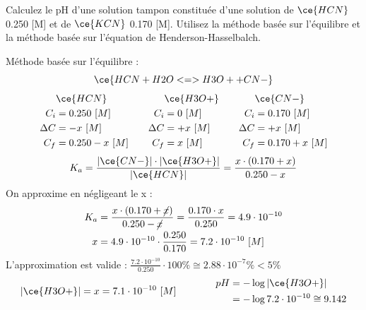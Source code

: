 \documentclass[
  11pt,
  french,
  a4paper,
  openany]{book}
\begin{document}
\begin{Exercise}
Calculez le pH d'une solution tampon constituée d'une solution de \(\ce{HCN}\) 0.250 {[}M{]} et de \(\ce{KCN}\) 0.170 {[}M{]}. Utilisez la méthode basée sur l'équilibre et la méthode basée sur l'équation de Henderson-Hasselbalch.

\end{Exercise}

\begin{Answer}
Méthode basée sur l'équilibre :
\[
\ce{HCN + H2O <=> H3O+ + CN-}
\]
\[
\begin{split}
&\ce{HCN}\\
C_i &= 0.250\ [M] \\
\Delta C &= - x\ [M] \\
C_f &= 0.250 - x\ [M] \\
\end{split}
\qquad
\begin{split}
&\ce{H3O+}\\
C_i &= 0\ [M] \\
\Delta C &= + x\ [M] \\
C_f &= x\ [M] \\
\end{split}
\qquad
\begin{split}
&\ce{CN-}\\
C_i &= 0.170\ [M] \\
\Delta C &= + x\ [M] \\
C_f &= 0.170 + x\ [M] \\
\end{split}
\]
\[
K_a = \frac{|\ce{CN-}| \cdot |\ce{H3O+}|}{|\ce{HCN}|} = \frac{x \cdot (0.170 + x)}{0.250 - x}
\]
On approxime en négligeant le x :
\[
\begin{split}
K_a &= \frac{x \cdot (0.170 + \cancel{x})}{0.250 - \cancel{x}} = \frac{0.170 \cdot x}{0.250} = 4.9 \cdot 10^{-10} \\
x &= 4.9 \cdot 10^{-10} \cdot \frac{0.250}{0.170} = 7.2 \cdot 10^{-10}\ [M]
\end{split}
\]
L'approximation est valide : \(\frac{7.2 \cdot 10^{-10}}{0.250} \cdot 100\% \cong 2.88 \cdot 10^{-7}\% < 5\%\)
\[
\begin{split}
|\ce{H3O+}| = x = 7.1 \cdot 10^{-10}\ [M]
\end{split}
\qquad\qquad
\begin{split}
pH &= - \log |\ce{H3O+}| \\
 &= - \log 7.2 \cdot 10^{-10} \cong 9.142
\end{split}
\]


\end{Answer}
\end{document}

